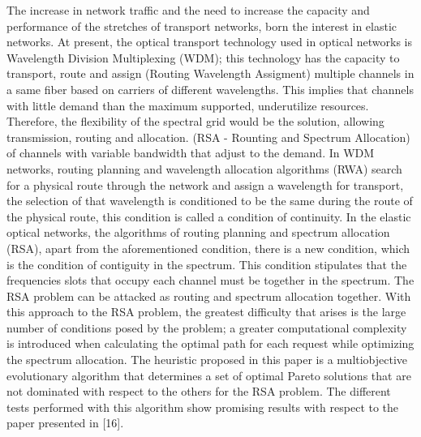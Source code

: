 The increase in network traffic and the need to increase the capacity
and performance of the stretches of transport networks, born the interest
in elastic networks. At present, the optical transport technology
used in optical networks is Wavelength Division Multiplexing (WDM);
this technology has the capacity to transport, route and assign (Routing
Wavelength Assigment) multiple channels in a same fiber based on carriers
of different wavelengths. This implies that channels with little demand
than the maximum supported, underutilize resources. Therefore, the
flexibility of the spectral grid would be the solution, allowing transmission,
routing and allocation. (RSA - Rounting and Spectrum Allocation) of
channels with variable bandwidth that adjust to the demand. In WDM
networks, routing planning and wavelength allocation algorithms (RWA)
search for a physical route through the network and assign a wavelength
for transport, the selection of that wavelength is conditioned to
be the same during the route of the physical route, this condition
is called a condition of continuity. In the elastic optical networks,
the algorithms of routing planning and spectrum allocation (RSA),
apart from the aforementioned condition, there is a new condition,
which is the condition of contiguity in the spectrum. This condition
stipulates that the frequencies slots that occupy each channel must
be together in the spectrum. The RSA problem can be attacked as routing
and spectrum allocation together. With this approach to the RSA problem,
the greatest difficulty that arises is the large number of conditions
posed by the problem; a greater computational complexity is introduced
when calculating the optimal path for each request while optimizing
the spectrum allocation. The heuristic proposed in this paper is a
multiobjective evolutionary algorithm that determines a set of optimal
Pareto solutions that are not dominated with respect to the others
for the RSA problem. The different tests performed with this algorithm
show promising results with respect to the paper presented in {[}16{]}. 
